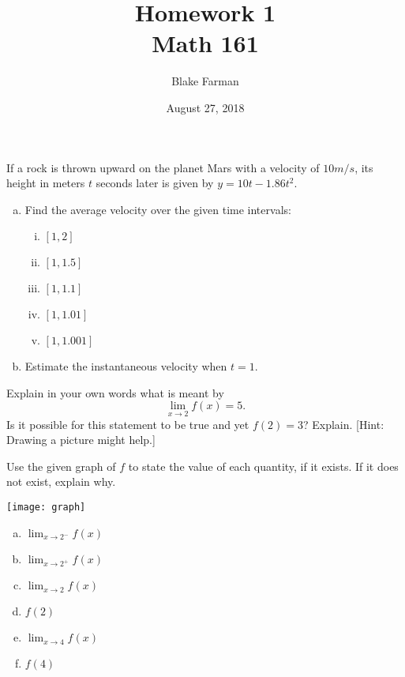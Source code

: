 \documentclass[10pt]{amsart}
\title[Homework 1]{Homework 1\\Math 161}
\date{August 27, 2018}
\author{Blake Farman}
\begin{document}
\maketitle

\makenameslot

\begin{thm}
  If a rock is thrown upward on the planet Mars with a velocity of \(10 m/s\), its height in meters \(t\) seconds later is given by \(y = 10t - 1.86t^2\).
  \begin{enumerate}[(a)]
  \item
    Find the average velocity over the given time intervals:
    \begin{enumerate}[(i)]
    \item
      \([1,2]\)
      \vspace{1in}
    \item
      \([1,1.5]\)
      \vspace{1in}
    \item
      \([1,1.1]\)
      \vspace{1in}
    \item
      \([1,1.01]\)
      \newpage
    \item
      \([1,1.001]\)
      \vspace{1in}
    \end{enumerate}
  \item
    Estimate the instantaneous velocity when \(t = 1\).
    \vspace{1in}
  \end{enumerate}
\end{thm}

\begin{thm}
  Explain in your own words what is meant by
  \[\lim_{x \to 2} f(x) = 5.\]
  Is it possible for this statement to be true and yet \(f(2) = 3\)?
  Explain.
  {[Hint: Drawing a picture might help.]}
\end{thm}

\vspace{2in}

\begin{thm}
  Use the given graph of \(f\) to state the value of each quantity, if it exists.
  If it does not exist, explain why.
  \begin{center}
    \texttt{[image: graph]}
  \end{center}
  \newpage
  \begin{enumerate}[(a)]
  \item
    \(\lim_{x \to 2^{-}} f(x)\)
    \vspace{1in}
  \item
    \(\lim_{x \to 2^{+}} f(x)\)
    \vspace{1in}
  \item
    \(\lim_{x \to 2} f(x)\)
    \vspace{1in}
  \item
    \(f(2)\)
    \vspace{1in}
  \item
    \(\lim_{x \to 4} f(x)\)
    \vspace{1in}
  \item
    \(f(4)\)
    \vspace{1in}
  \end{enumerate}
\end{thm}
\end{document}
